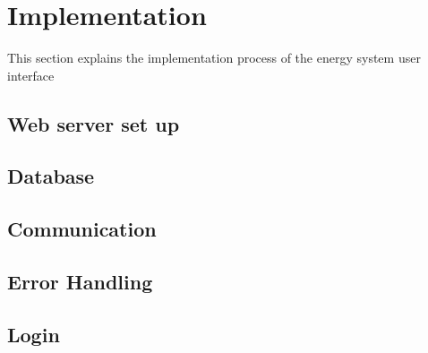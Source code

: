 \section{Implementation}
This section explains the implementation process of the energy system user interface


\subsection{Web server set up}
\subsection{Database}
\subsection{Communication}
\subsection{Error Handling}
\subsection{Login}
